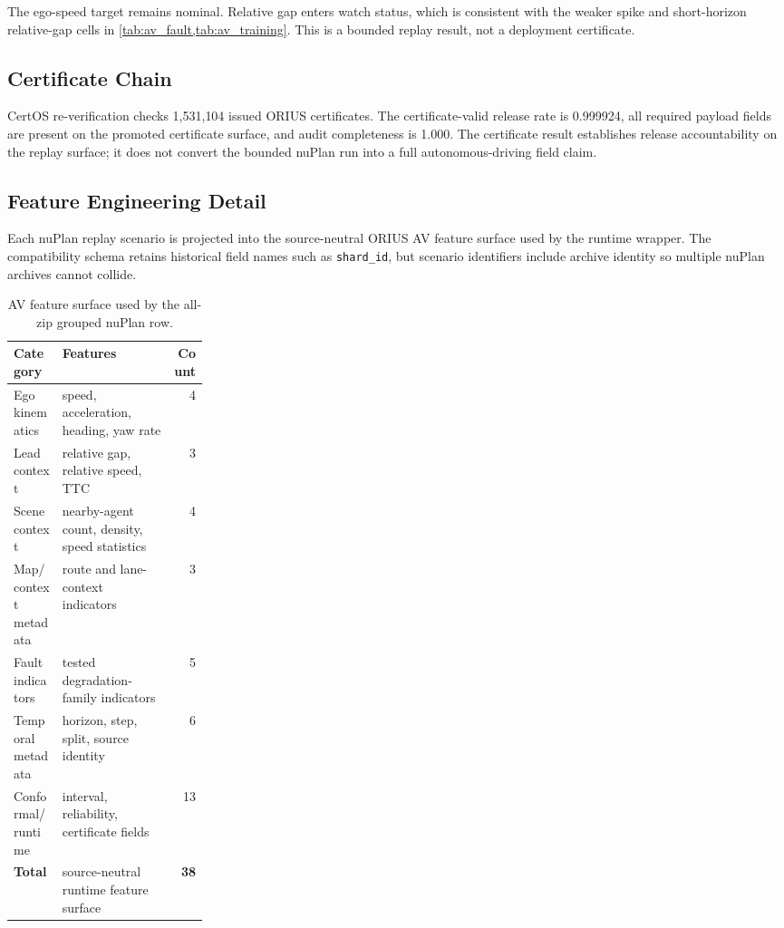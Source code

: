 The ego-speed target remains nominal.  Relative gap enters watch status, which is
consistent with the weaker spike and short-horizon relative-gap cells in
\cref{tab:av_fault,tab:av_training}.  This is a bounded replay result, not a
deployment certificate.

\subsection{Certificate Chain}

CertOS re-verification checks 1{,}531{,}104 issued ORIUS certificates.  The
certificate-valid release rate is 0.999924, all required payload fields are present
on the promoted certificate surface, and audit completeness is 1.000.  The
certificate result establishes release accountability on the replay surface; it does
not convert the bounded nuPlan run into a full autonomous-driving field claim.

\subsection{Feature Engineering Detail}

Each nuPlan replay scenario is projected into the source-neutral ORIUS AV feature
surface used by the runtime wrapper.  The compatibility schema retains historical
field names such as \texttt{shard\_id}, but scenario identifiers include archive
identity so multiple nuPlan archives cannot collide.

\begin{table}[h]
\caption{AV feature surface used by the all-zip grouped nuPlan row.}
\label{tab:av_features}
\centering\footnotesize
\begin{tabularx}{\linewidth}{p{0.25\linewidth}Xr}
\toprule
\textbf{Category} & \textbf{Features} & \textbf{Count} \\
\midrule
Ego kinematics & speed, acceleration, heading, yaw rate & 4 \\
Lead context & relative gap, relative speed, TTC & 3 \\
Scene context & nearby-agent count, density, speed statistics & 4 \\
Map/context metadata & route and lane-context indicators & 3 \\
Fault indicators & tested degradation-family indicators & 5 \\
Temporal metadata & horizon, step, split, source identity & 6 \\
Conformal/runtime & interval, reliability, certificate fields & 13 \\
\midrule
\textbf{Total} & source-neutral runtime feature surface & \textbf{38} \\
\bottomrule
\end{tabularx}
\end{table}


